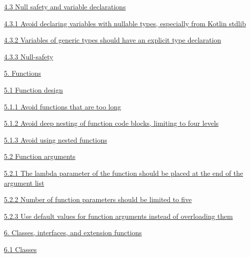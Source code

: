 \hspace{0.5cm}\hyperref[sec:4.3]{ 4.3 Null safety and variable declarations}

\hspace{1.0cm}\hyperref[sec:4.3.1]{ 4.3.1 Avoid declaring variables with nullable types, especially from Kotlin stdlib}

\hspace{1.0cm}\hyperref[sec:4.3.2]{ 4.3.2 Variables of generic types should have an explicit type declaration}

\hspace{1.0cm}\hyperref[sec:4.3.3]{ 4.3.3 Null-safety}

\hspace{0.0cm}\hyperref[sec:]{}

\hspace{0.0cm}\hyperref[sec:5.]{5. Functions}

\hspace{0.5cm}\hyperref[sec:5.1]{ 5.1 Function design}

\hspace{1.0cm}\hyperref[sec:5.1.1]{ 5.1.1 Avoid functions that are too long }

\hspace{1.0cm}\hyperref[sec:5.1.2]{ 5.1.2 Avoid deep nesting of function code blocks, limiting to four levels}

\hspace{1.0cm}\hyperref[sec:5.1.3]{ 5.1.3 Avoid using nested functions}

\hspace{0.5cm}\hyperref[sec:5.2]{ 5.2 Function arguments}

\hspace{1.0cm}\hyperref[sec:5.2.1]{ 5.2.1 The lambda parameter of the function should be placed at the end of the argument list}

\hspace{1.0cm}\hyperref[sec:5.2.2]{ 5.2.2 Number of function parameters should be limited to five}

\hspace{1.0cm}\hyperref[sec:5.2.3]{ 5.2.3 Use default values for function arguments instead of overloading them}

\hspace{0.0cm}\hyperref[sec:]{}

\hspace{0.0cm}\hyperref[sec:6.]{6. Classes, interfaces, and extension functions}

\hspace{0.5cm}\hyperref[sec:6.1]{ 6.1 Classes}

